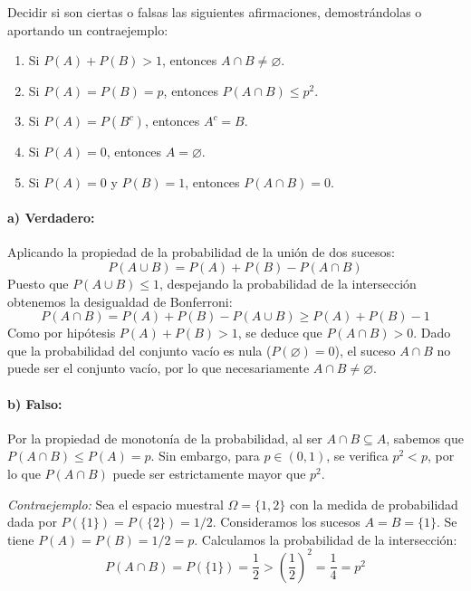 \newpage
\begin{problema}
Decidir si son ciertas o falsas las siguientes afirmaciones, demostrándolas o aportando un contraejemplo:
\begin{enumerate}[label=\alph*)]
    \item Si $P(A) + P(B) > 1$, entonces $A \cap B \neq \varnothing$.
    \item Si $P(A) = P(B) = p$, entonces $P(A \cap B) \le p^2$.
    \item Si $P(A) = P(B^c)$, entonces $A^c = B$.
    \item Si $P(A) = 0$, entonces $A = \varnothing$.
    \item Si $P(A) = 0$ y $P(B) = 1$, entonces $P(A \cap B) = 0$.
\end{enumerate}

\tcblower

\paragraph{a) Verdadero:}
Aplicando la propiedad de la probabilidad de la unión de dos sucesos:
\[
    P(A \cup B) = P(A) + P(B) - P(A \cap B)
\]
Puesto que $P(A \cup B) \le 1$, despejando la probabilidad de la intersección obtenemos la desigualdad de Bonferroni:
\[
    P(A \cap B) = P(A) + P(B) - P(A \cup B) \ge P(A) + P(B) - 1
\]
Como por hipótesis $P(A) + P(B) > 1$, se deduce que $P(A \cap B) > 0$. Dado que la probabilidad del conjunto vacío es nula ($P(\varnothing) = 0$), el suceso $A \cap B$ no puede ser el conjunto vacío, por lo que necesariamente $A \cap B \neq \varnothing$.

\paragraph{b) Falso:}
Por la propiedad de monotonía de la probabilidad, al ser $A \cap B \subseteq A$, sabemos que $P(A \cap B) \le P(A) = p$. Sin embargo, para $p \in (0,1)$, se verifica $p^2 < p$, por lo que $P(A \cap B)$ puede ser estrictamente mayor que $p^2$.

\textit{Contraejemplo:} Sea el espacio muestral $\Omega = \{1, 2\}$ con la medida de probabilidad dada por $P(\{1\}) = P(\{2\}) = 1/2$. Consideramos los sucesos $A = B = \{1\}$.
Se tiene $P(A) = P(B) = 1/2 = p$. Calculamos la probabilidad de la intersección:
\[
    P(A \cap B) = P(\{1\}) = \frac{1}{2} > \left(\frac{1}{2}\right)^2 = \frac{1}{4} = p^2
\]


\end{problema}
